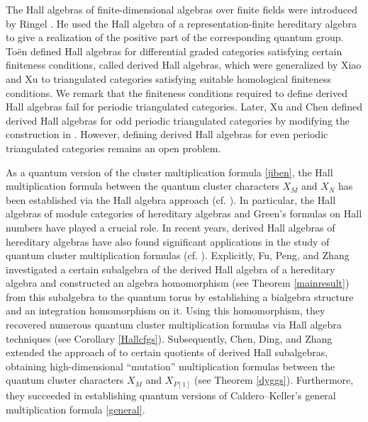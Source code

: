 \documentclass[reqno,12pt]{amsart}
\numberwithin{equation}{section}
\theoremstyle{plain} %
\theoremstyle{definition} %
\begin{document}
The Hall algebras of finite-dimensional algebras over finite fields were introduced by Ringel \cite{R90, R90a}. He used the Hall algebra of a representation-finite hereditary algebra to give a realization of the positive part of the corresponding quantum group. To\"en \cite{Toen2006} defined Hall algebras for differential graded categories satisfying certain finiteness conditions, called derived Hall algebras, which were generalized by Xiao and Xu \cite{XiaoXu} to triangulated categories satisfying suitable homological finiteness conditions. We remark that the finiteness conditions required to define derived Hall algebras fail for periodic triangulated categories. Later, Xu and Chen \cite{XuChen} defined derived Hall algebras for odd periodic triangulated categories by modifying the construction in \cite{XiaoXu}. However, defining derived Hall algebras for even periodic triangulated categories remains an open problem.

As a quantum version of the cluster multiplication formula \eqref{jiben}, the Hall multiplication formula between the quantum cluster characters $X_M$ and $X_N$ has been established via the Hall algebra approach (cf. \cite{DX, Fei, BR, CDX, DSC, FPZ}). In particular, the Hall algebras of module categories of hereditary algebras and Green's formulas on Hall numbers have played a crucial role. In recent years, derived Hall algebras of hereditary algebras have also found significant applications in the study of quantum cluster multiplication formulas (cf. \cite{CDZ, FPZ}). Explicitly, Fu, Peng, and Zhang \cite{FPZ} investigated a certain subalgebra of the derived Hall algebra of a hereditary algebra and constructed an algebra homomorphism (see Theorem \ref{mainresult}) from this subalgebra to the quantum torus by establishing a bialgebra structure and an integration homomorphism on it. Using this homomorphism, they recovered numerous quantum cluster multiplication formulas via Hall algebra techniques (see Corollary \ref{Hallcfgs}). Subsequently, Chen, Ding, and Zhang \cite{CDZ} extended the approach of \cite{FPZ} to certain quotients of derived Hall subalgebras, obtaining high-dimensional ``mutation'' multiplication formulas between the quantum cluster characters $X_M$ and $X_{P[1]}$ (see Theorem \ref{dyggs}). Furthermore, they succeeded in establishing quantum versions of Caldero--Keller's general multiplication formula \eqref{general}.
\end{document}
